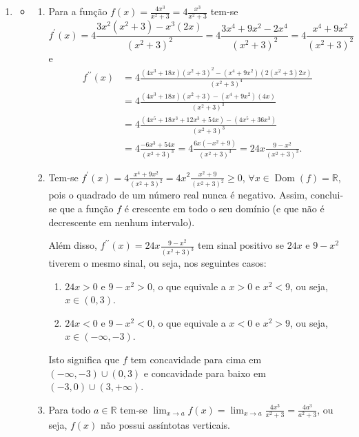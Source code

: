 \documentclass[12pt,a4paper]{article}
\newcommand*\dom[1]{\operatorname{Dom}\left(#1\right)}
\newcommand*\R{\mathbb{R}}
\begin{document}
\begin{enumerate}
\begin{enumerate}
\end{enumerate}
\item
\begin{itemize}
\item
\begin{enumerate}
\item Para a função $f(x) = \frac{4x^3}{x^2+3} = 4\frac{x^3}{x^2+3}$ tem-se
\[
f^\prime(x)
= 4\frac{3x^2(x^2+3)-x^3(2x)}{(x^2+3)^2}
= 4\frac{3x^4+9x^2-2x^4}{(x^2+3)^2}
= 4\frac{x^4 + 9x^2}{(x^2+3)^2}
\]
e
\begin{align*}
f^{\prime\prime}(x)
& = 4\frac{(4x^3+18x)(x^2+3)^2-(x^4+9x^2)(2(x^2+3)2x)}{(x^2+3)^4} \\
& = 4\frac{(4x^3+18x)(x^2+3)-(x^4+9x^2)(4x)}{(x^2+3)^3}\\
& = 4\frac{(4x^5+18x^3 + 12x^3+54x)-(4x^5+36x^3)}{(x^2+3)^3}\\
& = 4\frac{-6x^3 + 54x}{(x^2+3)^3}
  = 4\frac{6x (-x^2 + 9)}{(x^2+3)^3}
  = 24x \frac{9-x^2}{(x^2+3)^3}.
\end{align*}

\item Tem-se $f^\prime(x) = 4\frac{x^4 + 9x^2}{(x^2+3)^2} = 4x^2\frac{x^2 + 9}{(x^2+3)^2} \geq 0$, $\forall x \in \dom{f} = \R$, pois o quadrado de um número real nunca é negativo. Assim, conclui-se que a função $f$ é crescente em todo o seu domínio (e que não é decrescente em nenhum intervalo).

Além disso, $f^{\prime\prime}(x) = 24x \frac{9-x^2}{(x^2+3)^3}$ tem sinal positivo se $24x$ e $9-x^2$ tiverem o mesmo sinal, ou seja, nos seguintes casos:
\begin{enumerate}
\item $24x>0$ e $9-x^2>0$, o que equivale a $x>0$ e $x^2 < 9$, ou seja, $x \in (0,3)$.
\item $24x<0$ e $9-x^2<0$, o que equivale a $x<0$ e $x^2 > 9$, ou seja, $x \in (-\infty,-3)$.
\end{enumerate}
Isto significa que $f$ tem concavidade para cima em $(-\infty,-3) \cup (0,3)$ e concavidade para baixo em $(-3,0) \cup (3, +\infty)$.

\item Para todo $a \in \R$ tem-se $\lim_{x\to a} f(x) = \lim_{x\to a} \frac{4x^3}{x^2+3} = \frac{4a^3}{a^2+3}$, ou seja, $f(x)$ não possui assíntotas verticais.


\end{enumerate}
\end{itemize}
\end{enumerate}
\end{document}
